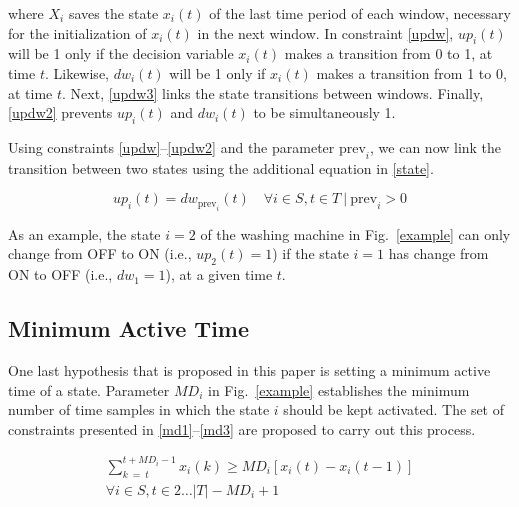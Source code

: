 \noindent where $X_i$ saves the state $x_i(t)$ of the last time period of each window, necessary for the initialization of $x_i(t)$ in the next window. In constraint \eqref{updw}, $up_i(t)$ will be 1 only if the decision variable $x_i(t)$ makes a transition from 0 to 1, at time $t$. Likewise, $dw_i(t)$ will be 1 only if $x_i(t)$ makes a transition from 1 to 0, at time $t$. Next, \eqref{updw3} links the state transitions between windows. Finally, \eqref{updw2} prevents $up_i(t)$ and $dw_i(t)$ to be simultaneously 1.


Using constraints \eqref{updw}--\eqref{updw2} and the parameter $\text{prev}_i$, we can now link the transition between two states using the additional equation in \eqref{state}.

\begin{equation} \label{state}
    up_i(t) = dw_{\text{prev}_i}(t) \quad \forall i \in S, t \in T \ | \ \text{prev}_i>0
\end{equation}

As an example, the state $i = 2$ of the washing machine in Fig.~\ref{example} can only change from OFF to ON (i.e., $up_2(t) = 1$) if the state $i = 1$ has change from ON to OFF (i.e., $dw_1 = 1$), at a given time $t$.

\subsection{Minimum Active Time}

One last hypothesis that is proposed in this paper is setting a minimum active time of a state. Parameter $MD_i$ in Fig.~\ref{example} establishes the minimum number of time samples in which the state $i$ should be kept activated. The set of constraints presented in \eqref{md1}--\eqref{md3} are proposed to carry out this process. 

\begin{multline}\label{md2}
    \sum_{k\ =\ t}^{t+MD_i-1} x_i(k) \geq MD_i \left[ x_i(t) - x_i(t-1) \right] \\
    \forall i \in S, t \in 2 \hdots |T| - {MD}_i + 1
\end{multline}

